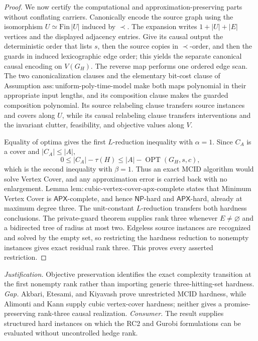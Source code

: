 \documentclass{article}
\begin{document}
\begin{proof}
We now certify the computational and approximation-preserving parts without
conflating carriers.  Canonically encode the source graph using the
isomorphism \(U\simeq\mathrm{Fin}\,|U|\) induced by \(\prec\).  The
expansion writes \(1+|U|+|E|\) vertices and the displayed adjacency entries.
Give its causal output the deterministic order that lists \(s\), then the
source copies in \(\prec\)-order, and then the guards in induced
lexicographic edge order; this yields the separate canonical causal encoding
on \(V(G_H)\).  The reverse map performs one ordered edge scan.  The two
canonicalization clauses and the elementary bit-cost clause of Assumption
\(\mathrm{ass{:}uniform\mbox{-}poly\mbox{-}time\mbox{-}model}\) make both
maps polynomial in their appropriate input lengths, and its composition
clause makes the guarded composition polynomial.  Its source relabeling
clause transfers source instances and covers along \(U\), while its causal
relabeling clause transfers interventions and the invariant clutter,
feasibility, and objective values along \(V\).

Equality of optima gives the first \(L\)-reduction inequality with
\(\alpha=1\).  Since \(C_A\) is a cover and \(|C_A|\leq|A|\),
\[
 0\leq |C_A|-\tau(H)
 \leq |A|-\operatorname{OPT}(G_H,s,c),
\]
which is the second inequality with \(\beta=1\).  Thus an exact MCID
algorithm would solve Vertex Cover, and any approximation error is carried
back with no enlargement.  Lemma
\(\mathrm{lem{:}cubic\mbox{-}vertex\mbox{-}cover\mbox{-}apx\mbox{-}complete}\)
states that Minimum Vertex Cover is \(\mathsf{APX}\)-complete, and hence
\(\mathsf{NP}\)-hard and \(\mathsf{APX}\)-hard, already at maximum degree
three.  The unit-constant \(L\)-reduction transfers both hardness
conclusions.  The private-guard theorem supplies rank three whenever
\(E\neq\varnothing\) and a bidirected tree of radius at most two.  Edgeless
source instances are recognized and solved by the empty set, so restricting
the hardness reduction to nonempty instances gives exact residual rank
three.  This proves every asserted restriction.
\end{proof}
\par\smallskip\noindent \textit{Justification.} Objective preservation identifies the exact complexity transition at the first nonempty rank rather than importing generic three-hitting-set hardness. \textit{Gap.} Akbari, Etesami, and Kiyavash prove unrestricted MCID hardness, while Alimonti and Kann supply cubic vertex-cover hardness; neither gives a promise-preserving rank-three causal realization. \textit{Consumer.} The result supplies structured hard instances on which the RC2 and Gurobi formulations can be evaluated without uncontrolled hedge rank.
\end{document}
